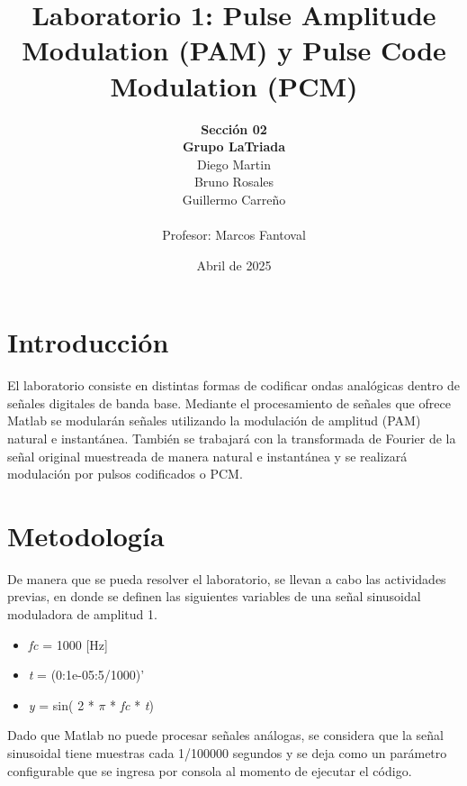 \documentclass[letter,12pt]{article}
\begin{document}
%
   \title{\Huge{Laboratorio 1: Pulse Amplitude Modulation (PAM) y Pulse Code Modulation (PCM)}}

   \author{\textbf{Sección 02} \\\textbf{Grupo LaTriada}  \\Diego Martin \\Bruno Rosales \\Guillermo Carreño \\ \\ Profesor: Marcos Fantoval}
          
   \date{Abril de 2025}

   \maketitle
   
   \tableofcontents
 
  \newpage
  

\section{Introducción}
El laboratorio consiste en distintas formas de codificar ondas analógicas dentro de señales digitales de banda base. Mediante el procesamiento de señales que ofrece Matlab se modularán señales utilizando la modulación de amplitud (PAM) natural e instantánea. También se trabajará con la transformada de Fourier de la señal original muestreada de manera natural e instantánea y se realizará modulación por pulsos codificados o PCM.

\section{Metodología}
De manera que se pueda resolver el laboratorio, se llevan a cabo las actividades previas, en donde se definen las siguientes variables de una señal sinusoidal moduladora de amplitud 1.

\begin{itemize}
    \item \textit{fc} = 1000 [Hz]
    \item \textit{t} = (0:1e-05:5/1000)'
    \item \textit{y} = sin( 2 * $\pi$ * \textit{fc} * \textit{t})
\end{itemize}

Dado que Matlab no puede procesar señales análogas, se considera que la señal sinusoidal tiene muestras cada 1/100000 segundos y se deja como un parámetro configurable que se ingresa por consola al momento de ejecutar el código.
\end{document}
